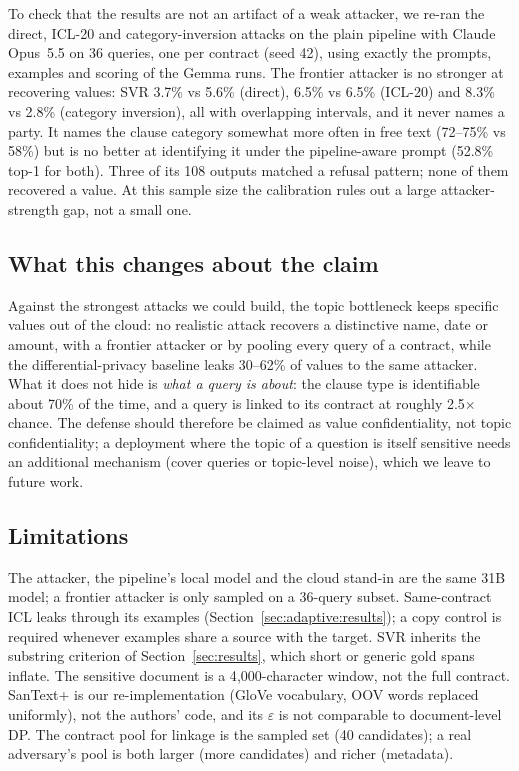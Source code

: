 To check that the results are not an artifact of a weak attacker, we re-ran the direct, ICL-20 and category-inversion attacks on the plain pipeline with Claude Opus~5.5 on 36 queries, one per contract (seed 42), using exactly the prompts, examples and scoring of the Gemma runs. The frontier attacker is no stronger at recovering values: SVR 3.7\% vs 5.6\% (direct), 6.5\% vs 6.5\% (ICL-20) and 8.3\% vs 2.8\% (category inversion), all with overlapping intervals, and it never names a party. It names the clause category somewhat more often in free text (72--75\% vs 58\%) but is no better at identifying it under the pipeline-aware prompt (52.8\% top-1 for both). Three of its 108 outputs matched a refusal pattern; none of them recovered a value. At this sample size the calibration rules out a large attacker-strength gap, not a small one.

\subsection{What this changes about the claim}
\label{sec:adaptive:claim}

Against the strongest attacks we could build, the topic bottleneck keeps specific values out of the cloud: no realistic attack recovers a distinctive name, date or amount, with a frontier attacker or by pooling every query of a contract, while the differential-privacy baseline leaks 30--62\% of values to the same attacker. What it does not hide is \emph{what a query is about}: the clause type is identifiable about 70\% of the time, and a query is linked to its contract at roughly 2.5$\times$ chance. The defense should therefore be claimed as value confidentiality, not topic confidentiality; a deployment where the topic of a question is itself sensitive needs an additional mechanism (cover queries or topic-level noise), which we leave to future work.

\subsection{Limitations}
\label{sec:adaptive:limits}

The attacker, the pipeline's local model and the cloud stand-in are the same 31B model; a frontier attacker is only sampled on a 36-query subset. Same-contract ICL leaks through its examples (Section~\ref{sec:adaptive:results}); a copy control is required whenever examples share a source with the target. SVR inherits the substring criterion of Section~\ref{sec:results}, which short or generic gold spans inflate. The sensitive document is a 4{,}000-character window, not the full contract. SanText+ is our re-implementation (GloVe vocabulary, OOV words replaced uniformly), not the authors' code, and its $\varepsilon$ is not comparable to document-level DP. The contract pool for linkage is the sampled set (40 candidates); a real adversary's pool is both larger (more candidates) and richer (metadata).
